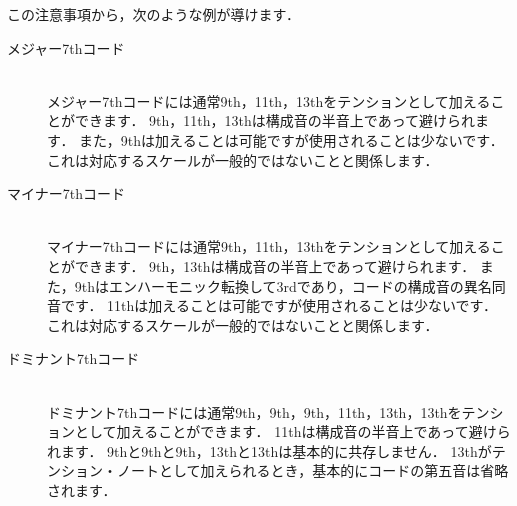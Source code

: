 \documentclass[dvipdfmx,uplatex,b5paper,openany,jbase=12Q,nomag*,textwidth-limit=44%
               ]{gachimuchi}[2020/05/05]
\begin{document}
この注意事項から，次のような例が導けます．
\begin{description}
  \item[メジャー7thコード] ~\\
  メジャー7thコードには通常9th，\bSharp 11th，13thをテンションとして加えることができます．
  \bFlat 9th，11th，\bFlat 13thは構成音の半音上であって避けられます．
  また，\bSharp 9thは加えることは可能ですが使用されることは少ないです．
  これは対応するスケールが一般的ではないことと関係します．
  \begin{Music}
    \nostartrule%
    \Startpiece
    \Notes%
    \hsk%
    \en%
    \endpiece
  \end{Music}
  \item[マイナー7thコード] ~\\
  マイナー7thコードには通常9th，11th，13thをテンションとして加えることができます．
  \bFlat 9th，\bFlat 13thは構成音の半音上であって避けられます．
  また，\bSharp 9thはエンハーモニック転換して\bFlat 3rdであり，コードの構成音の異名同音です．
  \bSharp 11thは加えることは可能ですが使用されることは少ないです．
  これは対応するスケールが一般的ではないことと関係します．
  \begin{Music}
    \nostartrule%
    \Startpiece
    \Notes%
    \en%
    \endpiece
  \end{Music}
  \item[ドミナント7thコード] ~\\
  ドミナント7thコードには通常\bFlat 9th，9th，\bSharp 9th，\bSharp 11th，\bFlat 13th，13thをテンションとして加えることができます．
  11thは構成音の半音上であって避けられます．
  \bFlat 9thと9thと\bSharp 9th，\bFlat 13thと13thは基本的に共存しません．
  \bFlat 13thがテンション・ノートとして加えられるとき，基本的にコードの第五音は省略されます．
  \begin{Music}
    \nostartrule%
    \Startpiece
    \Notes%

\end{Music}
\end{description}
\end{document}
